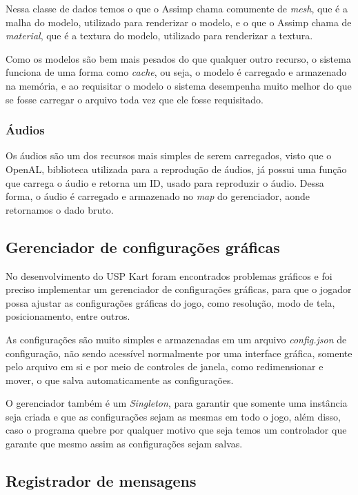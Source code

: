 Nessa classe de dados temos o que o Assimp chama comumente de \textit{mesh}, que é a malha do modelo, utilizado para renderizar o modelo, e o que o Assimp chama de \textit{material}, que é a textura do modelo, utilizado para renderizar a textura.

Como os modelos são bem mais pesados do que qualquer outro recurso, o sistema funciona de uma forma como \textit{cache}, ou seja, o modelo é carregado e armazenado na memória, e ao requisitar o modelo o sistema desempenha muito melhor do que se fosse carregar o arquivo toda vez que ele fosse requisitado.

\subsubsection{Áudios}

Os áudios são um dos recursos mais simples de serem carregados, visto que o OpenAL, biblioteca utilizada para a reprodução de áudios, já possui uma função que carrega o áudio e retorna um ID, usado para reproduzir o áudio. Dessa forma, o áudio é carregado e armazenado no \textit{map} do gerenciador, aonde retornamos o dado bruto.

\subsection{Gerenciador de configurações gráficas}\label{sec:gerenciador-de-configuracoes-graficas}

No desenvolvimento do USP Kart foram encontrados problemas gráficos e foi preciso implementar um gerenciador de configurações gráficas, para que o jogador possa ajustar as configurações gráficas do jogo, como resolução, modo de tela, posicionamento, entre outros.

As configurações são muito simples e armazenadas em um arquivo \textit{config.json} de configuração, não sendo acessível normalmente por uma interface gráfica, somente pelo arquivo em si e por meio de controles de janela, como redimensionar e mover, o que salva automaticamente as configurações.

O gerenciador também é um \textit{Singleton}, para garantir que somente uma instância seja criada e que as configurações sejam as mesmas em todo o jogo, além disso, caso o programa quebre por qualquer motivo que seja temos um controlador que garante que mesmo assim as configurações sejam salvas.

\subsection{Registrador de mensagens}

